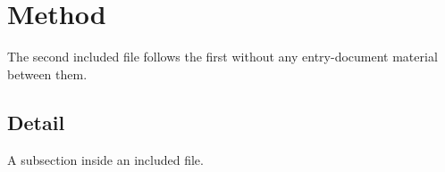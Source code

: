 \section{Method}
The second included file follows the first without any entry-document
material between them.

\subsection{Detail}
A subsection inside an included file.
